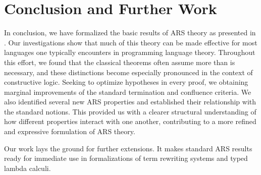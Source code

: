 \section{Conclusion and Further Work}
\label{sec:Conclusion}

In conclusion, we have formalized the basic results of ARS theory as
presented in \cite{Terese}.  Our investigations show that much of this
theory can be made effective for most languages one typically encounters
in programming language theory.
Throughout this effort, we found that the classical theorems often assume
  more than is necessary, and these distinctions become especially pronounced
  in the context of constructive logic.
  Seeking to optimize hypotheses in every proof, we obtaining marginal improvements of the standard
termination and confluence criteria.
We also identified several new ARS properties
and established their relationship with the standard notions.
This provided us with a
clearer structural understanding of how different properties interact
with one another, contributing to a more refined and
expressive formulation of ARS theory.

Our work lays the ground for further extensions.  It makes standard ARS results
ready for immediate use in formalizations of term rewriting systems and typed
lambda calculi.



%
